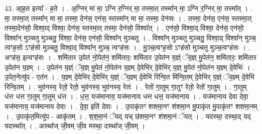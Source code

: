 \documentclass[17pt]{extarticle}
\begin{document}
43. आ॒ह॒त इत्या᳚ - ह॒ते । . अ॒ग्निर् मा॑ मा॒ ऽग्नि र॒ग्निर् मा॒ तस्मा॒त् तस्मा᳚न् मा॒ ऽग्नि र॒ग्निर् मा॒ तस्मा᳚त् । . मा॒ तस्मा॒त् तस्मा᳚न् मा मा॒ तस्मा॒ देन॑स॒ एन॑स॒ स्तस्मा᳚न् मा मा॒ तस्मा॒ देन॑सः । . तस्मा॒ देन॑स॒ एन॑स॒ स्तस्मा॒त् तस्मा॒देन॑सो॒ विश्वा॒द् विश्वा॒ देन॑स॒ स्तस्मा॒त् तस्मा॒ देन॑सो॒ विश्वा᳚त् । . एन॑सो॒ विश्वा॒द् विश्वा॒ देन॑स॒ एन॑सो॒ विश्वा᳚न् मुञ्चतु मुञ्चतु॒ विश्वा॒ देन॑स॒ एन॑सो॒ विश्वा᳚न् मुञ्चतु । . विश्वा᳚न् मुञ्चतु मुञ्चतु॒ विश्वा॒द् विश्वा᳚न् मुञ्च॒ त्वꣳह॒सो ऽꣳह॑सो मुञ्चतु॒ विश्वा॒द् विश्वा᳚न् मुञ्च॒ त्वꣳह॑सः । . मु॒ञ्च॒त्वꣳह॒सो ऽꣳह॑सो मुञ्चतु मुञ्च॒त्वꣳह॑सः । . अꣳह॑स॒ इत्यꣳह॑सः । . शमि॑तार उ॒पेत॑ नो॒पेत॑न॒ शमि॑तारः॒ शमि॑तार उ॒पेत॑न य॒ज्ञ्ं ॅय॒ज्ञ् मु॒पेत॑न॒ शमि॑तारः॒ शमि॑तार उ॒पेत॑न य॒ज्ञ्म् । . उ॒पेत॑न य॒ज्ञ्ं ॅय॒ज्ञ् मु॒पेत॑ नो॒पेत॑न य॒ज्ञ्म् दे॒वेभि॑र् दे॒वेभि॑र् य॒ज्ञ् मु॒पेत॑ नो॒पेत॑न य॒ज्ञ्म् दे॒वेभिः॑ । . उ॒पेत॒नेत्यु॑प - एत॑न । . य॒ज्ञ्म् दे॒वेभि॑र् दे॒वेभि॑र् य॒ज्ञ्ं ॅय॒ज्ञ्म् दे॒वेभि॑ रिन्वि॒त मि॑न्वि॒तम् दे॒वेभि॑र् य॒ज्ञ्ं ॅय॒ज्ञ्म् दे॒वेभि॑ रिन्वि॒तम् । . भुव॑नस्य॒ रेतो॒ रेतो॒ भुव॑नस्य॒ भुव॑नस्य॒ रेतः॑ । . रेतो॑ गा॒तुम् गा॒तुꣳ रेतो॒ रेतो॑ गा॒तुम् । . गा॒तुम् ध॑त्त धत्त गा॒तुम् गा॒तुम् ध॑त्त । . ध॒त्त॒ यज॑मानाय॒ यज॑मानाय धत्त धत्त॒ यज॑मानाय । . यज॑मानाय देवा देवा॒ यज॑मानाय॒ यज॑मानाय देवाः । . दे॒वा॒ इति॑ देवाः । . उ॒पाकृ॑तꣳ शशमा॒नꣳ श॑शमा॒न मु॒पाकृ॑त मु॒पाकृ॑तꣳ शशमा॒नम् । . उ॒पाकृ॑त॒मित्यु॑प - आकृ॑तम् । . श॒श॒मा॒नं ॅयद् यच् छ॑शमा॒नꣳ श॑शमा॒नं ॅयत् । . यदस्था॒ दस्था॒द् यद् यदस्था᳚त् । . अस्था᳚ज् जी॒वम् जी॒व मस्था॒ दस्था᳚ज् जी॒वम् । \newline
\end{document}
